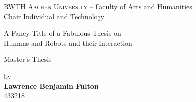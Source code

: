 

\begin{titlepage}
  \begin{center}

    {\large
      \textsc{RWTH Aachen University} -- Faculty of Arts and Humanities\\
      Chair Individual and Technology
    }

    \vspace{3.2 cm}

    \hrulefill\par
    { 
      \huge
      A Fancy Title of a Fabulous Thesis on\\
      Humans and Robots and their Interaction\\
    }
    \par\medskip\hrulefill\par

    \vspace{2.1 cm}

    {\huge
      Master's Thesis
    }

    \vspace{1.5 cm}

    {\Large by\\[2.3ex]
      {\bf Lawrence Benjamin Fulton}\\[2.3ex]
      433218
    }
    
    \vspace{1.7 cm}


\end{center}
\end{titlepage}
